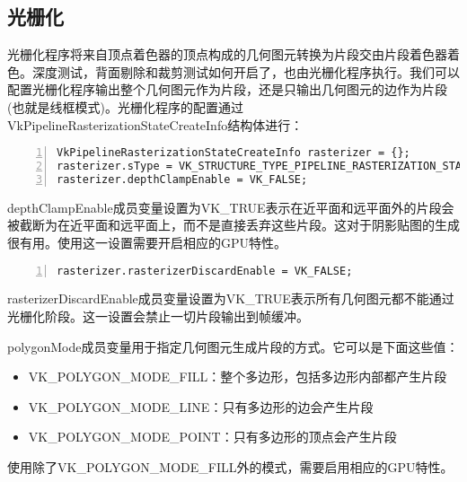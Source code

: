\documentclass{ctexart}
\begin{document}
\subsection{光栅化}

光栅化程序将来自顶点着色器的顶点构成的几何图元转换为片段交由片段着色器着色。深度测试，背面剔除和裁剪测试如何开启了，也由光栅化程序执行。我们可以配置光栅化程序输出整个几何图元作为片段，还是只输出几何图元的边作为片段(也就是线框模式)。光栅化程序的配置通过VkPipelineRasterizationStateCreateInfo结构体进行：

\begin{lstlisting}[language={[ANSI]C},keywordstyle=\color{blue!70},commentstyle=\color{red!50!green!50!blue!50},frame=shadowbox, rulesepcolor=\color{red!20!green!20!blue!20},basicstyle=\small,numbers=left, numberstyle=\tiny,breaklines=true]
VkPipelineRasterizationStateCreateInfo rasterizer = {};
rasterizer.sType = VK_STRUCTURE_TYPE_PIPELINE_RASTERIZATION_STATE_CREATE_INFO;
rasterizer.depthClampEnable = VK_FALSE;
\end{lstlisting}

depthClampEnable成员变量设置为VK\_TRUE表示在近平面和远平面外的片段会被截断为在近平面和远平面上，而不是直接丢弃这些片段。这对于阴影贴图的生成很有用。使用这一设置需要开启相应的GPU特性。

\begin{lstlisting}[language={[ANSI]C},keywordstyle=\color{blue!70},commentstyle=\color{red!50!green!50!blue!50},frame=shadowbox, rulesepcolor=\color{red!20!green!20!blue!20},basicstyle=\small,numbers=left, numberstyle=\tiny,breaklines=true]
rasterizer.rasterizerDiscardEnable = VK_FALSE;
\end{lstlisting}

rasterizerDiscardEnable成员变量设置为VK\_TRUE表示所有几何图元都不能通过光栅化阶段。这一设置会禁止一切片段输出到帧缓冲。

polygonMode成员变量用于指定几何图元生成片段的方式。它可以是下面这些值：

\begin{itemize}
	\item VK\_POLYGON\_MODE\_FILL：整个多边形，包括多边形内部都产生片段
	\item VK\_POLYGON\_MODE\_LINE：只有多边形的边会产生片段
	\item VK\_POLYGON\_MODE\_POINT：只有多边形的顶点会产生片段
\end{itemize}

使用除了VK\_POLYGON\_MODE\_FILL外的模式，需要启用相应的GPU特性。
\end{document}
